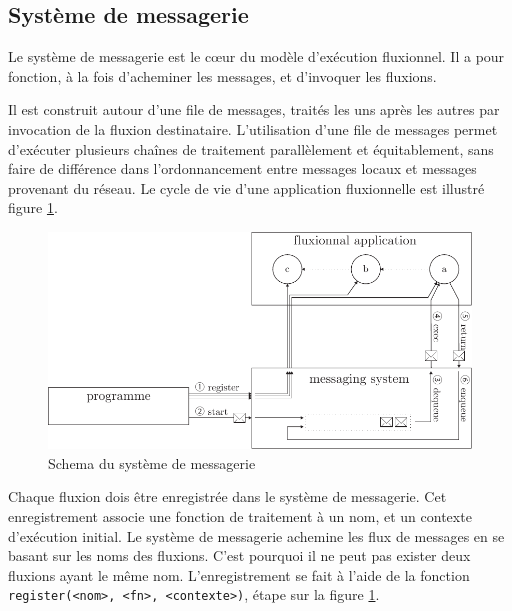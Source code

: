 
\subsection{Système de messagerie}

Le système de messagerie est le cœur du modèle d'exécution fluxionnel.
Il a pour fonction, à la fois d'acheminer les messages, et d'invoquer les fluxions.

Il est construit autour d'une file de messages, traités les uns après les autres par invocation de la fluxion destinataire.
L'utilisation d'une file de messages permet d'exécuter plusieurs chaînes de traitement parallèlement et équitablement, sans faire de différence dans l'ordonnancement entre messages locaux et messages provenant du réseau.
Le cycle de vie d'une application fluxionnelle est illustré figure \ref{fig:messagerie}.

\begin{figure}[h!]
  \includegraphics[width=\linewidth]{schema-message.pdf}
  \caption{Schema du système de messagerie}
  \label{fig:messagerie}
\end{figure}

Chaque fluxion dois être enregistrée dans le système de messagerie.
Cet enregistrement associe une fonction de traitement à un nom, et un contexte d'exécution initial.
Le système de messagerie achemine les flux de messages en se basant sur les noms des fluxions.
C'est pourquoi il ne peut pas exister deux fluxions ayant le même nom.
L'enregistrement se fait à l'aide de la fonction \texttt{register(<nom>, <fn>, <contexte>)}, étape  sur la figure \ref{fig:messagerie}.

